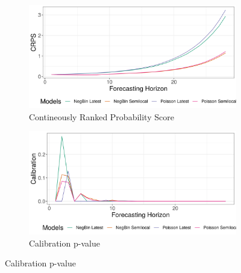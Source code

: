 \begin{figure}[H]
\begin{subfigure}{0.5\textwidth}
  \centering
  \includegraphics[width=\linewidth]{../output/Kyondo_crps.png}  
  \caption{Contineously Ranked Probability Score}
  \label{fig:sub-first}
\end{subfigure}
\begin{subfigure}{0.5\textwidth}
  \centering
  \includegraphics[width=\linewidth]{../output/Kyondo_calibration.png}  
  \caption{Calibration p-value}
  \label{fig:sub-second}
\end{subfigure}


\end{figure}
